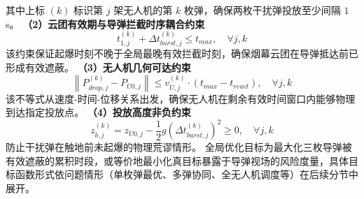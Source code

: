 \documentclass{JXUSTmodeling}
\begin{document}
其中上标 $(k)$ 标识第 $j$ 架无人机的第 $k$ 枚弹，确保两枚干扰弹投放至少间隔 $1$ s。
\textbf{（2）云团有效期与导弹拦截时序耦合约束}
\begin{equation}
t_{1,j}^{(k)} + \Delta t_{burst,j}^{(k)} \leq t_{max},\quad \forall j,k \tag{9}
\end{equation}
该约束保证起爆时刻不晚于全局最晚有效拦截时刻，确保烟幕云团在导弹抵达前已形成有效遮蔽。
\textbf{（3）无人机几何可达约束}
\begin{equation}
\left\|P_{drop,j}^{(k)}-P_{U0,j}\right\| \leq v_{U,j}^{(k)} \cdot \left(t_{max}-t_{react}\right),\quad \forall j,k \tag{10}
\end{equation}
该不等式从速度-时间-位移关系出发，确保无人机在剩余有效时间窗口内能够物理到达指定投放点。
\textbf{（4）投放高度非负约束}
\begin{equation}
z_{b,j}^{(k)} = z_{U0,j} - \frac{1}{2}g\left(\Delta t_{burst,j}^{(k)}\right)^2 \geq 0,\quad \forall j,k \tag{11}
\end{equation}
防止干扰弹在触地前未起爆的物理荒谬情形。
全局优化目标为最大化三枚导弹被有效遮蔽的累积时段，或等价地最小化真目标暴露于导弹视场的风险度量，具体目标函数形式依问题情形（单枚弹最优、多弹协同、全无人机调度等）在后续分节中展开。
\end{document}
